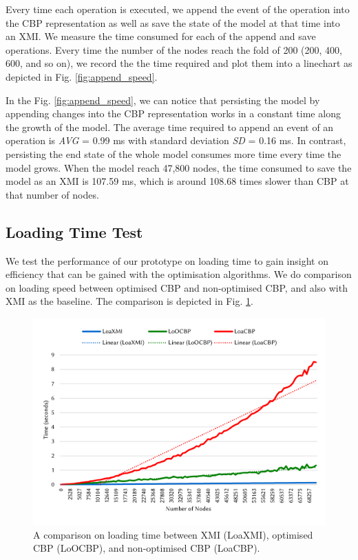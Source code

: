 \documentclass{llncs}
\begin{document}
{Every time each operation is executed, we append the event of the operation into the CBP representation as well as save the state of the model at that time into an XMI. We measure the time consumed for each of the append and save operations. Every time the number of the nodes reach the fold of 200 (200, 400, 600, and so on), we record the the time required and plot them into a linechart as depicted in Fig. \ref{fig:append_speed}.

In the Fig. \ref{fig:append_speed}, we can notice that persisting the model by appending changes into the CBP representation works in a constant time along the growth of the model. The average time required to append an event of an operation is \emph{AVG} = 0.99 ms with standard deviation \emph{SD} = 0.16 ms. In contrast, persisting the end state of the whole model consumes more time every time the model grows. When the model reach 47,800 nodes, the time consumed to save the model as an XMI is 107.59 ms, which is around 108.68 times slower than CBP at that number of nodes. 

\subsection{Loading Time Test}
\label{subsec:loading_time_test}
We test the performance of our prototype on loading time to gain insight on efficiency that can be gained with the optimisation algorithms. We do comparison on loading speed between optimised CBP and non-optimised CBP, and also with XMI as the baseline. The  comparison is depicted in Fig. \ref{fig:loading_speed}.

\begin{figure}[ht]
\centering
\includegraphics[width=\linewidth]{loading_speed}
\caption{A comparison on loading time between XMI (LoaXMI), optimised CBP (LoOCBP), and non-optimised CBP (LoaCBP).}
\label{fig:loading_speed}
\end{figure}

}
\end{document}
